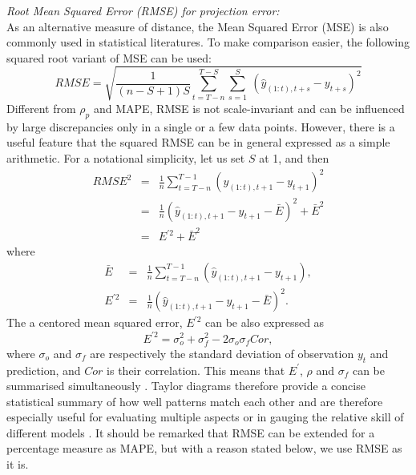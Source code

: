 \documentclass[a4paper]{article}
\newcommand{\disp}{\displaystyle}
\begin{document}
\vspace{0.2cm} \noindent
{\it Root Mean Squared Error (RMSE) for projection error:}\\
As an alternative measure of distance, the Mean Squared Error (MSE) is also commonly used in statistical literatures. To make comparison easier, the following squared root variant of MSE can be used: 
\begin{equation}
RMSE = \disp \sqrt{ \frac{1}{(n-S+1)S} \sum_{t=T-n}^{T-S} \sum_{s=1}^S \
\left( \hat{y}_{(1:t),t+s}-y_{t+s} \right)^2 }
\end{equation} 
Different from $\rho_p$ and MAPE, RMSE is not scale-invariant and can be influenced by large discrepancies only in a single or a few data points. However, there is a useful feature that the squared RMSE can be in general expressed as a simple arithmetic. For a notational simplicity, let us set $S$ at 1, and then 
\begin{equation}
\begin{array}{lcl}
{RMSE}^2 &=& \disp \frac{1}{n} \sum_{t=T-n}^{T-1} \left( \hat{y}_{(1:t),t+1}-y_{t+1} \right)^2 \\
&=& \disp \frac{1}{n} \left( \hat{y}_{(1:t),t+1}-y_{t+1} - \bar{E} \right)^2 + \bar{E}^2 \\
&=& \disp E^{\prime 2} + \bar{E}^2
\end{array}
\end{equation}
where 
\begin{equation}
\begin{array}{lcl}
\bar{E} &=& \disp \frac{1}{n} \sum_{t=T-n}^{T-1} \left( \hat{y}_{(1:t),t+1}-y_{t+1} \right), \\
E^{\prime 2} &=& \disp \frac{1}{n} \left( \hat{y}_{(1:t),t+1}-y_{t+1} - \bar{E} \right)^2.
\end{array}
\end{equation}
The a centored mean squared error, $E^{\prime 2}$ can be also expressed as 
\begin{equation}
E^{\prime 2} = \sigma_o^2 + \sigma_f^2 - 2\sigma_o \sigma_f Cor,
\end{equation}
where $\sigma_o$ and $\sigma_f$ are respectively the standard deviation of observation $y_t$ and prediction, and $Cor$ is their correlation. This means that $E^\prime$, $\rho$ and $\sigma_f$ can be summarised simultaneously \citep{taylor2001summarizing}. Taylor diagrams therefore provide a concise statistical summary of how well patterns match each other and are therefore especially useful for evaluating multiple aspects or in gauging the relative skill of different models \citep{griggs2002climate}. It should be remarked that RMSE can be extended for a percentage measure as MAPE, but with a reason stated below, we use RMSE as it is. 
\end{document}
